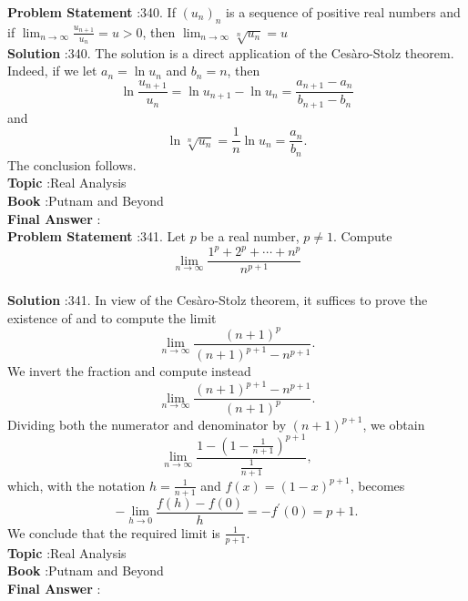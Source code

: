 \documentclass[10pt]{article}
\begin{document}
\textbf{Problem Statement} :340. If $\left(u_{n}\right)_{n}$ is a sequence of positive real numbers and if $\lim _{n \rightarrow \infty} \frac{u_{n+1}}{u_{n}}=u>0$, then $\lim _{n \rightarrow \infty} \sqrt[n]{u_{n}}=u$\\
\textbf{Solution} :340. The solution is a direct application of the Cesàro-Stolz theorem. Indeed, if we let $a_{n}=\ln u_{n}$ and $b_{n}=n$, then$$ \ln \frac{u_{n+1}}{u_{n}}=\ln u_{n+1}-\ln u_{n}=\frac{a_{n+1}-a_{n}}{b_{n+1}-b_{n}} $$and$$ \ln \sqrt[n]{u_{n}}=\frac{1}{n} \ln u_{n}=\frac{a_{n}}{b_{n}} . $$The conclusion follows.\\
\textbf{Topic} :Real Analysis\\
\textbf{Book} :Putnam and Beyond\\
\textbf{Final Answer} :\\


\textbf{Problem Statement} :341. Let $p$ be a real number, $p \neq 1$. Compute$$ \lim _{n \rightarrow \infty} \frac{1^{p}+2^{p}+\cdots+n^{p}}{n^{p+1}} $$\\
\textbf{Solution} :341. In view of the Cesàro-Stolz theorem, it suffices to prove the existence of and to compute the limit$$ \lim _{n \rightarrow \infty} \frac{(n+1)^{p}}{(n+1)^{p+1}-n^{p+1}} . $$We invert the fraction and compute instead$$ \lim _{n \rightarrow \infty} \frac{(n+1)^{p+1}-n^{p+1}}{(n+1)^{p}} . $$Dividing both the numerator and denominator by $(n+1)^{p+1}$, we obtain$$ \lim _{n \rightarrow \infty} \frac{1-\left(1-\frac{1}{n+1}\right)^{p+1}}{\frac{1}{n+1}}, $$which, with the notation $h=\frac{1}{n+1}$ and $f(x)=(1-x)^{p+1}$, becomes$$ -\lim _{h \rightarrow 0} \frac{f(h)-f(0)}{h}=-f^{\prime}(0)=p+1 . $$We conclude that the required limit is $\frac{1}{p+1}$.\\
\textbf{Topic} :Real Analysis\\
\textbf{Book} :Putnam and Beyond\\
\textbf{Final Answer} :\\
\end{document}
